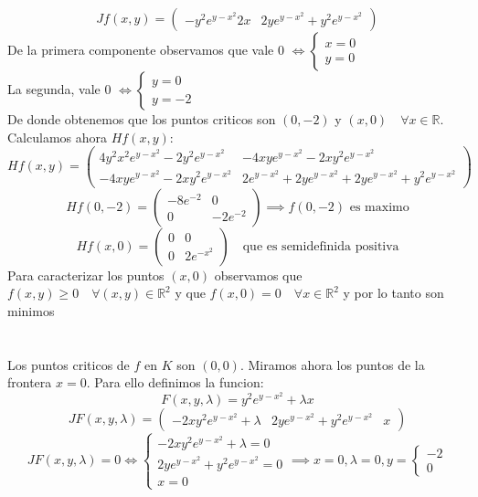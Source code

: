 \documentclass{article}
\begin{document}
 \[
 Jf(x, y) = \begin{pmatrix}
 -y^2e^{y-x^2}2x &
 2ye^{y-x^2} + y^2e^{y-x^2}
 \end{pmatrix}
 \]
 De la primera componente observamos que vale 0 $\iff \begin{cases} x =0 \\ y = 0 \end{cases}$
 \\
 La segunda, vale 0 $\iff \begin{cases} y = 0 \\ y = -2 \end{cases}$
 \\
 De donde obtenemos que los puntos criticos son $(0,-2)$ y $(x, 0) \quad \forall x \in \mathbb{R}$. Calculamos ahora $Hf(x, y)$:
 \[
 Hf(x, y) =
 \begin{pmatrix}
 4y^2x^2e^{y-x^2} - 2y^2e^{y-x^2} & -4xye^{y-x^2} - 2xy^2e^{y-x^2} \\
 -4xye^{y-x^2} -2xy^2e^{y-x^2} & 2e^{y-x^2} + 2ye^{y-x^2} + 2ye^{y-x^2} + y^2e^{y-x^2}
 \end{pmatrix}
\]
\[
Hf(0,-2) = \begin{pmatrix}
-8e^{-2} & 0 \\
0 & -2e^{-2}
\end{pmatrix}
\implies
f(0,-2) \text{ es maximo}
\]
\[
Hf(x, 0) =
\begin{pmatrix}
0 & 0 \\
0 & 2e^{-x^2}
\end{pmatrix}
\quad \text{que es semidefinida positiva}
 \]
 Para caracterizar los puntos $(x, 0)$ observamos que $f(x, y) \geq 0 \quad \forall (x, y) \in \mathbb{R}^2 $
 y que $f(x, 0) = 0 \quad \forall x \in \mathbb{R}^2$ y por lo tanto son minimos
\\
\\
\\
Los puntos criticos de $f$ en $K$ son $(0,0)$. Miramos ahora los puntos de la frontera $x = 0$.
Para ello definimos la funcion:
\[
F(x, y, \lambda) = y^2e^{y-x^2} + \lambda x
\]
\[
JF(x, y, \lambda) =
\begin{pmatrix} -2xy^2e^{y-x^2} + \lambda & 2ye^{y-x^2} + y^2e^{y-x^2} & x \end{pmatrix}
\]
\[
JF(x, y, \lambda) = 0 \iff
\begin{cases}
-2xy^2e^{y-x^2} + \lambda = 0 \\
 2ye^{y-x^2} + y^2e^{y-x^2} = 0 \\
 x = 0
\end{cases}
\implies
x = 0, \lambda = 0, y = \begin{cases} -2 \\ 0 \end{cases}
\]
\end{document}
